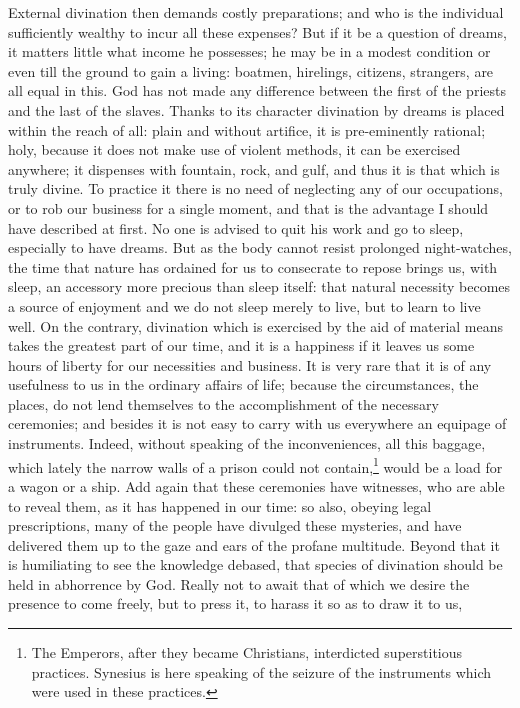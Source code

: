 \documentclass[12pt]{article}
\begin{document}
External divination then demands costly preparations; and who is the individual
sufficiently wealthy to incur all these expenses? But if it be a question of
dreams, it matters little what income he possesses; he may be in a modest
condition or even till the ground to gain a living: boatmen, hirelings,
citizens, strangers, are all equal in this. God has not made any difference
between the first of the priests and the last of the slaves. Thanks to its
character divination by dreams is placed within the reach of all: plain and
without artifice, it is pre-eminently rational; holy, because it does not make
use of violent methods, it can be exercised anywhere; it dispenses with
fountain, rock, and gulf, and thus it is that which is truly divine. To
practice it there is no need of neglecting any of our occupations, or to rob
our business for a single moment, and that is the advantage I should have
described at first. No one is advised to quit his work and go to sleep,
especially to have dreams. But as the body cannot resist prolonged
night-watches, the time that nature has ordained for us to consecrate to repose
brings us, with sleep, an accessory more precious than sleep itself: that
natural necessity becomes a source of enjoyment and we do not sleep merely to
live, but to learn to live well. On the contrary, divination which is exercised
by the aid of material means takes the greatest part of our time, and it is a
happiness if it leaves us some hours of liberty for our necessities and
business. It is very rare that it is of any usefulness to us in the ordinary
affairs of life; because the circumstances, the places, do not lend themselves
to the accomplishment of the necessary ceremonies; and besides it is not easy
to carry with us everywhere an equipage of instruments. Indeed, without
speaking of the inconveniences, all this baggage, which lately the narrow walls
of a prison could not contain,\footnote{The Emperors, after they became
Christians, interdicted superstitious practices. Synesius is here speaking of
the seizure of the instruments which were used in these practices.} would be a
load for a wagon or a ship. Add again that these ceremonies have witnesses, who
are able to reveal them, as it has happened in our time: so also, obeying legal
prescriptions, many of the people have divulged these mysteries, and have
delivered them up to the gaze and ears of the profane multitude. Beyond that it
is humiliating to see the knowledge debased, that species of divination should
be held in abhorrence by God. Really not to await that of which we desire the
presence to come freely, but to press it, to harass it so as to draw it to us,
\end{document}
